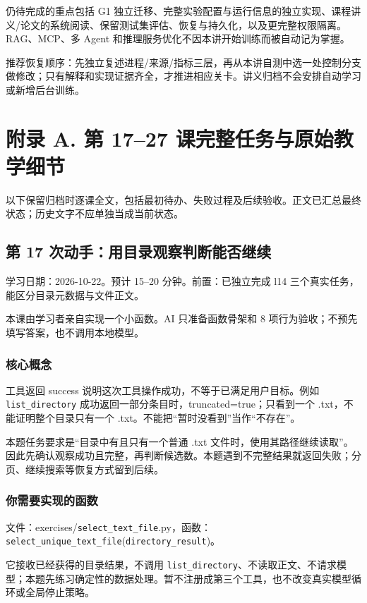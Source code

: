 仍待完成的重点包括 G1 独立迁移、完整实验配置与运行信息的独立实现、课程讲义/论文的系统阅读、保留测试集评估、恢复与持久化，以及更完整权限隔离。RAG、MCP、多 Agent 和推理服务优化不因本讲开始训练而被自动记为掌握。

推荐恢复顺序：先独立复述进程/来源/指标三层，再从本讲自测中选一处控制分支做修改；只有解释和实现证据齐全，才推进相应关卡。讲义归档不会安排自动学习或新增后台训练。

\section{附录 A. 第 17–27 课完整任务与原始教学细节}
以下保留归档时逐课全文，包括最初待办、失败过程及后续验收。正文已汇总最终状态；历史文字不应单独当成当前状态。

\subsection{第 17 次动手：用目录观察判断能否继续}

学习日期：2026-10-22。预计 15–20 分钟。前置：已独立完成 l14 三个真实任务，能区分目录元数据与文件正文。

本课由学习者亲自实现一个小函数。AI 只准备函数骨架和 8 项行为验收；不预先填写答案，也不调用本地模型。

\subsubsection{核心概念}

工具返回 success 说明这次工具操作成功，不等于已满足用户目标。例如 \nolinkurl{list_directory} 成功返回一部分条目时，truncated=true；只看到一个 .txt，不能证明整个目录只有一个 .txt。不能把“暂时没看到”当作“不存在”。

本题任务要求是“目录中有且只有一个普通 .txt 文件时，使用其路径继续读取”。因此先确认观察成功且完整，再判断候选数。本题遇到不完整结果就返回失败；分页、继续搜索等恢复方式留到后续。

\subsubsection{你需要实现的函数}

文件：exercises/\nolinkurl{select_text_file}.py，函数：\nolinkurl{select_unique_text_file}(\nolinkurl{directory_result})。

它接收已经获得的目录结果，不调用 \nolinkurl{list_directory}、不读取正文、不请求模型；本题先练习确定性的数据处理。暂不注册成第三个工具，也不改变真实模型循环或全局停止策略。

